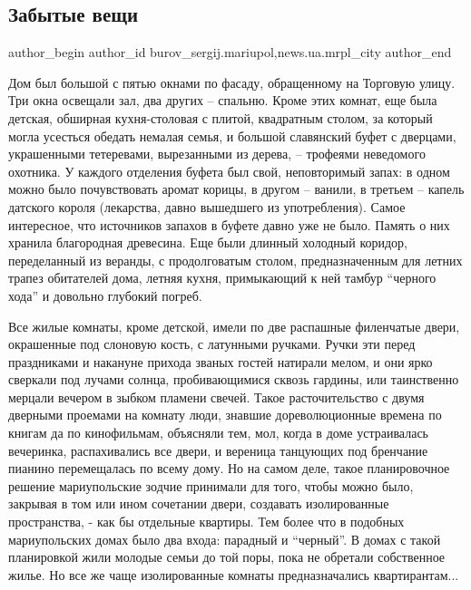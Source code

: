  
 
 
 
 
 
\subsection{Забытые вещи}
\label{sec:11_02_2018.stz.news.ua.mrpl_city.1.zabytye_veschi}
 
\ifcmt
 author_begin
   author_id burov_sergij.mariupol,news.ua.mrpl_city
 author_end
\fi

Дом был большой с пятью окнами по фасаду, обращенному на Торговую улицу. Три
окна освещали зал, два других – спальню. Кроме этих комнат, еще была детская,
обширная кухня-столовая с плитой, квадратным столом, за который могла усесться
обедать немалая семья, и большой славянский буфет с дверцами, украшенными
тетеревами, вырезанными из дерева, – трофеями  неведомого охотника. У каждого
отделения буфета был свой, неповторимый запах: в одном можно было почувствовать
аромат корицы, в другом – ванили, в третьем – капель датского короля
(лекарства, давно вышедшего из употребления). Самое интересное, что источников
запахов в буфете давно уже не было. Память о них хранила благородная древесина.
Еще были длинный холодный коридор, переделанный из веранды, с продолговатым
столом, предназначенным для летних трапез обитателей дома, летняя кухня,
примыкающий к ней тамбур \enquote{черного хода} и довольно глубокий погреб.

Все жилые комнаты, кроме детской, имели по две распашные филенчатые двери,
окрашенные под слоновую кость, с латунными ручками. Ручки эти перед праздниками
и накануне прихода званых гостей натирали мелом, и они ярко сверкали под лучами
солнца, пробивающимися сквозь гардины, или таинственно мерцали вечером в зыбком
пламени свечей. Такое расточительство с двумя дверными проемами на комнату
люди, знавшие дореволюционные времена по книгам да по кинофильмам, объясняли
тем, мол, когда в доме устраивалась вечеринка, распахивались все двери, и
вереница танцующих под бренчание пианино перемещалась по всему дому.  Но на
самом деле, такое планировочное решение мариупольские зодчие принимали для
того, чтобы можно было, закрывая в том или ином сочетании двери, создавать
изолированные пространства, - как бы отдельные квартиры. Тем более что в
подобных мариупольских домах было два входа: парадный и \enquote{черный}. В домах с
такой планировкой жили молодые семьи до той поры, пока не обретали собственное
жилье. Но все же чаще изолированные комнаты предназначались квартирантам...

